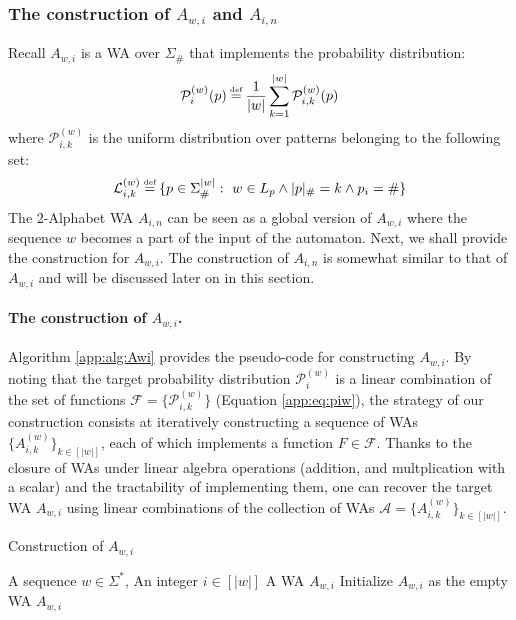 \subsubsection{The construction of $A_{w,i}$ and $A_{i,n}$} 
Recall $A_{w,i}$ is a WA over $\Sigma_{\#}$ that implements the probability distribution: 
\begin{equation} \label{app:eq:piw}
\mathcal{P}_{i}^{(w)}(p) \myeq \frac{1}{|w|} \sum\limits_{k=1}^{|w|} \mathcal{P}_{i,k}^{(w)}(p)
\end{equation}
where $\mathcal{P}_{i,k}^{(w)}$ is the uniform distribution over patterns belonging to the following set:
$$\mathcal{L}_{i,k}^{(w)} \myeq \{ p \in \Sigma_{\#}^{|w|}: ~ w \in L_{p} \land |p|_{\#} = k \land p_{i} = \# \}$$
The 2-Alphabet WA $A_{i,n}$ can be seen as a global version of $A_{w,i}$ where the sequence $w$ becomes a part of the input of the automaton. Next, we shall provide the construction for $A_{w,i}$. The construction of $A_{i,n}$ is somewhat similar to that of $A_{w,i}$ and will be discussed later on in this section.

\paragraph{The construction of $A_{w,i}$.} Algorithm \ref{app:alg:Awi} provides the pseudo-code for constructing $A_{w,i}$. By noting that the target probability distribution $\mathcal{P}_{i}^{(w)}$ is a linear combination of the set of functions $ \mathcal{F} = \{\mathcal{P}_{i,k}^{(w)}\}$ (Equation \ref{app:eq:piw}), the strategy of our construction  consists at iteratively constructing a sequence of WAs $\{A_{i,k}^{(w)}\}_{k \in [|w|]}$, each of which implements a function $F \in \mathcal{F}$. Thanks to the closure of WAs under linear algebra operations (addition, and multplication with a scalar) and the tractability of implementing them, one can recover the target WA $A_{w,i}$ using linear combinations of the collection of WAs $ \mathcal{A} = \{A_{i,k}^{(w)}\}_{k \in [|w|]}$. 

\begin{algorithm}
\caption{Construction of $A_{w,i}$}
\label{app:alg:Awi}
\begin{algorithmic}[1]
\REQUIRE A sequence $w \in \Sigma^{*}$, An integer $i \in [|w|]$
\ENSURE A WA $A_{w,i}$  
\STATE Initialize $A_{w,i}$ as the empty WA
\ENDFOR
\RETURN $A_{w,i}$
\end{algorithmic}
\end{algorithm}


